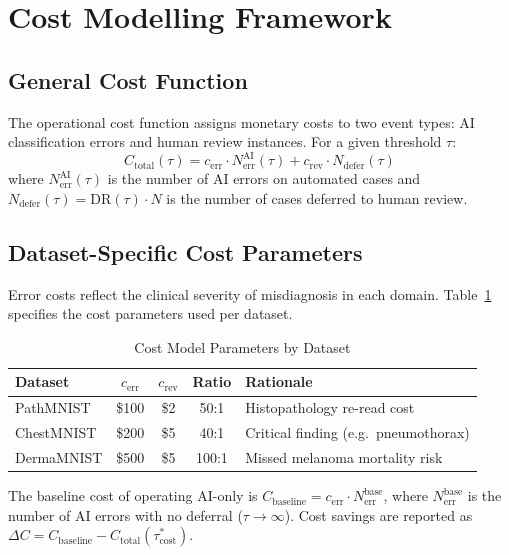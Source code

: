 \section{Cost Modelling Framework}
\label{sec:cost_model}

\subsection{General Cost Function}

The operational cost function assigns monetary costs to two event types: AI classification errors and human review instances. For a given threshold $\tau$:
\begin{equation}
    C_{\text{total}}(\tau) = c_{\text{err}} \cdot N_{\text{err}}^{\text{AI}}(\tau) + c_{\text{rev}} \cdot N_{\text{defer}}(\tau)
\end{equation}
where $N_{\text{err}}^{\text{AI}}(\tau)$ is the number of AI errors on automated cases and $N_{\text{defer}}(\tau) = \text{DR}(\tau) \cdot N$ is the number of cases deferred to human review.

\subsection{Dataset-Specific Cost Parameters}

Error costs reflect the clinical severity of misdiagnosis in each domain. Table~\ref{tab:cost_params} specifies the cost parameters used per dataset.

\begin{table}[h]
\footnotesize
\centering
\caption{Cost Model Parameters by Dataset}
\label{tab:cost_params}
\begin{tabular}{lcccl}
\toprule
\textbf{Dataset} & $c_{\text{err}}$ & $c_{\text{rev}}$ & \textbf{Ratio} & \textbf{Rationale} \\
\midrule
PathMNIST   & \$100 & \$2  & 50:1  & Histopathology re-read cost \\
ChestMNIST  & \$200 & \$5  & 40:1  & Critical finding (e.g.\ pneumothorax) \\
DermaMNIST  & \$500 & \$5  & 100:1 & Missed melanoma mortality risk \\
\bottomrule
\end{tabular}
\end{table}

The baseline cost of operating AI-only is $C_{\text{baseline}} = c_{\text{err}} \cdot N_{\text{err}}^{\text{base}}$, where $N_{\text{err}}^{\text{base}}$ is the number of AI errors with no deferral ($\tau \to \infty$). Cost savings are reported as $\Delta C = C_{\text{baseline}} - C_{\text{total}}(\tau^*_{\text{cost}})$.


